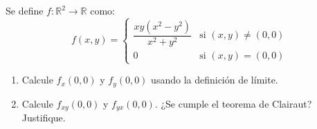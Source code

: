 Se define $f: \mathbb{R}^2 \to \mathbb{R}$ como:
\[
f(x, y) =
\begin{cases}
\dfrac{xy(x^2 - y^2)}{x^2 + y^2} & \text{si } (x, y) \neq (0, 0) \\[6pt]
0 & \text{si } (x, y) = (0, 0)
\end{cases}
\]
\begin{enumerate}
    \item Calcule $f_x(0, 0)$ y $f_y(0, 0)$ usando la definición de límite.
    \item Calcule $f_{xy}(0, 0)$ y $f_{yx}(0, 0)$. ¿Se cumple el teorema de Clairaut? Justifique.
\end{enumerate}
